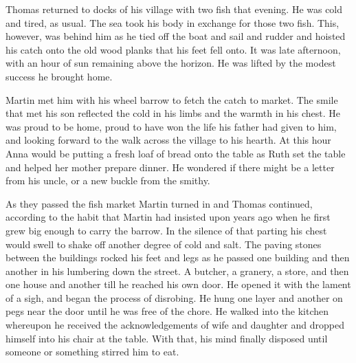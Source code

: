 

Thomas returned to docks of his village with two fish that evening.
He was cold and tired, as usual.  The sea took his body in exchange
for those two fish.  This, however, was behind him as he tied off the
boat and sail and rudder and hoisted his catch onto the old wood
planks that his feet fell onto.  It was late afternoon, with an hour
of sun remaining above the horizon.  He was lifted by the modest
success he brought home.

Martin met him with his wheel barrow to fetch the catch to market.
The smile that met his son reflected the cold in his limbs and the
warmth in his chest.  He was proud to be home, proud to have won the
life his father had given to him, and looking forward to the walk
across the village to his hearth.  At this hour Anna would be putting
a fresh loaf of bread onto the table as Ruth set the table and helped
her mother prepare dinner.  He wondered if there might be a letter
from his uncle, or a new buckle from the smithy.  

As they passed the fish market Martin turned in and Thomas continued,
according to the habit that Martin had insisted upon years ago when he
first grew big enough to carry the barrow.  In the silence of that
parting his chest would swell to shake off another degree of cold and
salt.  The paving stones between the buildings rocked his feet and
legs as he passed one building and then another in his lumbering down
the street.  A butcher, a granery, a store, and then one house and
another till he reached his own door.  He opened it with the lament of
a sigh, and began the process of disrobing.  He hung one layer and
another on pegs near the door until he was free of the chore.  He
walked into the kitchen whereupon he received the acknowledgements of
wife and daughter and dropped himself into his chair at the table.
With that, his mind finally disposed until someone or something
stirred him to eat.

\bye
